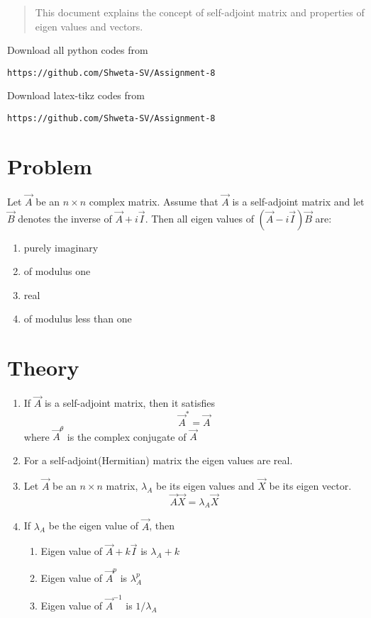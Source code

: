 \documentclass[journal,12pt,twocolumn]{IEEEtran}
\begin{document}
%
\vspace{2ex}
\begin{center}
\end{center}
\begin{abstract}
This document explains the concept of self-adjoint matrix and properties of eigen values and vectors.
\end{abstract}
Download all python codes from 
%
\begin{lstlisting}
https://github.com/Shweta-SV/Assignment-8
\end{lstlisting}
%
Download latex-tikz codes from 
%
\begin{lstlisting}
https://github.com/Shweta-SV/Assignment-8
\end{lstlisting}
%
\section{Problem}
Let $\vec{A}$ be an $n \times n$ complex matrix. Assume that $\vec{A}$ is a self-adjoint matrix and let $\vec{B}$ denotes the inverse of $\vec{A}+i\vec{I}$. Then all eigen values of $(\vec{A}-i\vec{I})\vec{B}$ are:
\begin{enumerate}
\item purely imaginary 
\item of modulus one 
\item real 
\item of modulus less than one
\end{enumerate}
\section{Theory}
\begin{enumerate}
\item If $\vec{A}$ is a self-adjoint matrix, then it satisfies 
\begin{equation}\label{2.0.1}
\vec{A}^{*} = \vec{A}
\end{equation}
where $\vec{A}^{\theta}$ is the complex conjugate of $\vec{A}$
\item For a self-adjoint(Hermitian) matrix the eigen values are real.
\item Let $\vec{A}$ be an $n \times n$ matrix, $\lambda_A$ be its eigen values and $\vec{X}$ be its eigen vector.
\begin{equation}\label{2.0.2}
\vec{A}\vec{X} = \lambda_A \vec{X} 
\end{equation}
\item If $\lambda_A$ be the eigen value of $\vec{A}$, then 
\begin{enumerate}
 \item Eigen value of $\vec{A}+k\vec{I}$ is $\lambda_A+k$
 \item Eigen value of $\vec{A}^p$ is $\lambda_A^p$
 \item Eigen value of $\vec{A}^{-1}$ is $1/\lambda_A$
\end{enumerate}
\end{enumerate}
\end{document}
